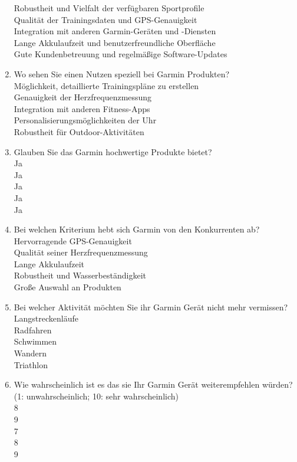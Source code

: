 \begin{enumerate}
    Robustheit und Vielfalt der verfügbaren Sportprofile \\
    Qualität der Trainingsdaten und GPS-Genauigkeit \\
    Integration mit anderen Garmin-Geräten und -Diensten \\
    Lange Akkulaufzeit und benutzerfreundliche Oberfläche \\
    Gute Kundenbetreuung und regelmäßige Software-Updates
    \item Wo sehen Sie einen Nutzen speziell bei Garmin Produkten? \\
    Möglichkeit, detaillierte Trainingspläne zu erstellen \\
    Genauigkeit der Herzfrequenzmessung \\
    Integration mit anderen Fitness-Apps \\
    Personalisierungsmöglichkeiten der Uhr \\
    Robustheit für Outdoor-Aktivitäten
    \item Glauben Sie das Garmin hochwertige Produkte bietet? \\
    Ja \\
    Ja \\
    Ja \\
    Ja \\
    Ja
    \item Bei welchen Kriterium hebt sich Garmin von den Konkurrenten ab? \\
    Hervorragende GPS-Genauigkeit \\
    Qualität seiner Herzfrequenzmessung \\
    Lange Akkulaufzeit \\
    Robustheit und Wasserbeständigkeit \\
    Große Auswahl an Produkten
    \item Bei welcher Aktivität möchten Sie ihr Garmin Gerät nicht mehr vermissen? \\
    Langstreckenläufe \\
    Radfahren \\
    Schwimmen \\
    Wandern \\
    Triathlon
    \item Wie wahrscheinlich ist es das sie Ihr Garmin Gerät weiterempfehlen würden? \\
    (1: unwahrscheinlich; 10: sehr wahrscheinlich) \\
    8 \\
    9 \\
    7 \\
    8 \\
    9
\end{enumerate}
